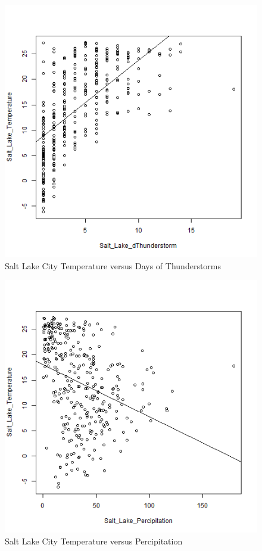 \begin{figure}
  \centering
  \includegraphics[width=15cm]{../data/img/Temp_vs_dThunderstorm.PNG}
  \caption{Salt Lake City Temperature versus Days of Thunderstorms}
  \label{fig:temp_vs_dthunderstorms}
\end{figure}

\begin{figure}
  \centering
  \includegraphics[width=15cm]{../data/img/Temp_vs_Percipitation.PNG}
  \caption{Salt Lake City Temperature versus Percipitation}
  \label{fig:temp_vs_percipitation}
\end{figure}

